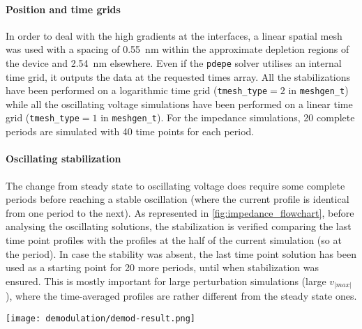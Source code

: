 	\paragraph{Position and time grids}
	In order to deal with the high gradients at the interfaces, a linear spatial mesh was used with a spacing of \SI{0.55}{\nm} within the approximate depletion regions of the device and \SI{2.54}{\nm} elsewhere.
	Even if the \texttt{pdepe} solver utilises an internal time grid, it outputs the data at the requested times array.
	All the stabilizations have been performed on a logarithmic time grid (\texttt{tmesh\_type}$=2$ in \texttt{meshgen_t}) while all the oscillating voltage simulations have been performed on a linear time grid (\texttt{tmesh\_type}$=1$ in \texttt{meshgen_t}).
	For the impedance simulations, 20 complete periods are simulated with 40 time points for each period.

	\paragraph{Oscillating stabilization}
	The change from steady state to oscillating voltage does require some complete periods before reaching a stable oscillation (where the current profile is identical from one period to the next).
	As represented in \cref{fig:impedance_flowchart}, before analysing the oscillating solutions, the stabilization is verified comparing the last time point profiles with the profiles at the half of the current simulation (so at the  period).
	In case the stability was absent, the last time point solution has been used as a starting point for 20 more periods, until when stabilization was ensured.
	This is mostly important for large perturbation simulations (large $v_|max|$), where the time\hyp{}averaged profiles are rather different from the steady state ones.

	\begin{SCfigure}%
		\centering
		\texttt{[image: demodulation/demod-result.png]}
		\label{fig:demodulation}
	\end{SCfigure}

